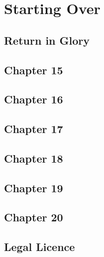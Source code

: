 \documentclass[12pt,twoside,onecolumn,openright,extrafontsizes]{memoir}
\begin{document}
\part{Starting Over}
	\chapter{Return in Glory}
	
	\chapter{Chapter 15}
	\lipsum[81-100]
	\chapter{Chapter 16}
	\lipsum[101-120]
	\chapter{Chapter 17}
	\lipsum[121-140]
	\chapter{Chapter 18}
	\lipsum[141-160]
	\chapter{Chapter 19}
	\lipsum[61-80]
	\chapter{Chapter 20}
	




\chapter{Legal Licence}


\end{document}
